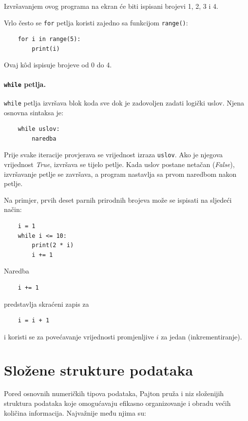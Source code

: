 Izvršavanjem ovog programa na ekran će biti ispisani brojevi 1, 2, 3 i 4.

Vrlo često se \texttt{for} petlja koristi zajedno sa funkcijom \texttt{range()}:

\begin{verbatim}
	for i in range(5):
	    print(i)
\end{verbatim}

Ovaj k\^od ispisuje brojeve od 0 do 4.

\paragraph{\texttt{while} petlja.} \texttt{while} petlja izvršava blok koda sve dok je zadovoljen zadati logički uslov. Njena osnovna sintaksa je:

\begin{verbatim}
	while uslov:
	    naredba
\end{verbatim}

Prije svake iteracije provjerava se vrijednost izraza \texttt{uslov}. Ako je njegova vrijednost \emph{True}, izvršava se tijelo petlje. Kada uslov postane netačan (\emph{False}), izvršavanje petlje se završava, a program nastavlja sa prvom naredbom nakon petlje.

Na primjer, prvih deset parnih prirodnih brojeva može se ispisati na sljedeći način:

\begin{verbatim}
	i = 1
	while i <= 10:
	    print(2 * i)
	    i += 1
\end{verbatim}

Naredba
\begin{verbatim}
	i += 1
\end{verbatim}
predstavlja skraćeni zapis za

\begin{verbatim}
	i = i + 1
\end{verbatim}

i koristi se za povećavanje vrijednosti promjenljive $i$  za jedan (inkrementiranje).

\section{Složene strukture podataka}

Pored osnovnih numeričkih tipova podataka, Pajton pruža i niz složenijih struktura podataka koje omogućavaju efikasno organizovanje i obradu većih količina informacija. Najvažnije među njima su:

